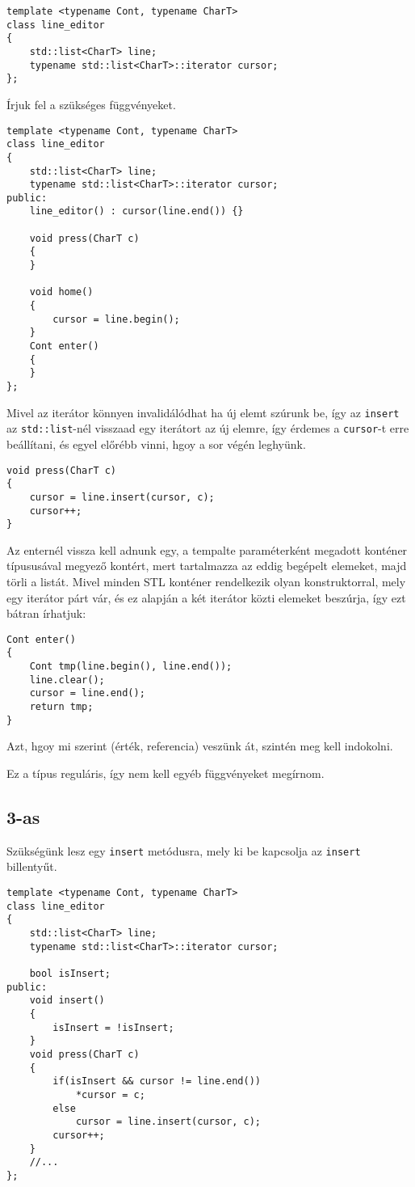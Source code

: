 \documentclass[a4paper,11.5pt]{article}
\begin{document}
\begin{lstlisting}
template <typename Cont, typename CharT>
class line_editor
{
	std::list<CharT> line;
	typename std::list<CharT>::iterator cursor;
};
\end{lstlisting}

	Írjuk fel a szükséges függvényeket.
	
\begin{lstlisting}
template <typename Cont, typename CharT>
class line_editor
{
	std::list<CharT> line;
	typename std::list<CharT>::iterator cursor;
public:
	line_editor() : cursor(line.end()) {}
	
	void press(CharT c)
	{
	}
	
	void home()
	{
		cursor = line.begin();
	}
	Cont enter()
	{
	}
};
\end{lstlisting}
	Mivel az iterátor könnyen invalidálódhat ha új elemt szúrunk be, így az \texttt{insert} az \texttt{std::list}-nél visszaad egy iterátort az új elemre, így érdemes a \texttt{cursor}-t erre beállítani, és egyel előrébb vinni, hgoy a sor végén leghyünk.
	\begin{lstlisting}
void press(CharT c)
{
	cursor = line.insert(cursor, c);
	cursor++;
}
	\end{lstlisting}
	Az enternél vissza kell adnunk egy, a tempalte paraméterként megadott konténer típususával megyező kontért, mert tartalmazza az eddig begépelt elemeket, majd törli a listát. Mivel minden STL konténer rendelkezik olyan konstruktorral, mely egy iterátor párt vár, és ez alapján a két iterátor közti elemeket beszúrja, így ezt bátran írhatjuk:
	\begin{lstlisting}
Cont enter()
{
	Cont tmp(line.begin(), line.end());
	line.clear();
	cursor = line.end();
	return tmp;
}
	\end{lstlisting}

	Azt, hgoy mi szerint (érték, referencia) veszünk át, szintén meg kell indokolni.
	
	Ez a típus reguláris, így nem kell egyéb függvényeket megírnom.
	
	\subsection{3-as}
	Szükségünk lesz egy \texttt{insert} metódusra, mely ki be kapcsolja az \texttt{insert} billentyűt.
\begin{lstlisting}
template <typename Cont, typename CharT>
class line_editor
{
	std::list<CharT> line;
	typename std::list<CharT>::iterator cursor;
	
	bool isInsert;
public:
	void insert()
	{
		isInsert = !isInsert;
	}
	void press(CharT c)
	{
		if(isInsert && cursor != line.end())
			*cursor = c;
		else
			cursor = line.insert(cursor, c);
		cursor++;
	}
	//...
};
\end{lstlisting}
\end{document}
